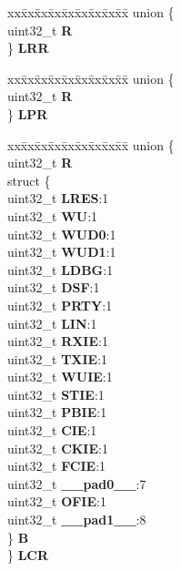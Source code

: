 \begin{DoxyCompactItemize}
\begin{tabbing}
\end{tabbing}\item 
\mbox{\label{structESCI__tag_acfca03def782b20da6a070330d2874b5}} 
\begin{tabbing}
xx\=xx\=xx\=xx\=xx\=xx\=xx\=xx\=xx\=\kill
union \{\\
\>uint32\_t {\bfseries R}\\
\} {\bfseries LRR}\\

\end{tabbing}\item 
\mbox{\label{structESCI__tag_adacd496165903d2f634d633ee7f3e37d}} 
\begin{tabbing}
xx\=xx\=xx\=xx\=xx\=xx\=xx\=xx\=xx\=\kill
union \{\\
\>uint32\_t {\bfseries R}\\
\} {\bfseries LPR}\\

\end{tabbing}\item 
\mbox{\label{structESCI__tag_ab3b84db9c2e74edcdc523254f2b716f8}} 
\begin{tabbing}
xx\=xx\=xx\=xx\=xx\=xx\=xx\=xx\=xx\=\kill
union \{\\
\>uint32\_t {\bfseries R}\\
\>struct \{\\
\>\>uint32\_t {\bfseries LRES}:1\\
\>\>uint32\_t {\bfseries WU}:1\\
\>\>uint32\_t {\bfseries WUD0}:1\\
\>\>uint32\_t {\bfseries WUD1}:1\\
\>\>uint32\_t {\bfseries LDBG}:1\\
\>\>uint32\_t {\bfseries DSF}:1\\
\>\>uint32\_t {\bfseries PRTY}:1\\
\>\>uint32\_t {\bfseries LIN}:1\\
\>\>uint32\_t {\bfseries RXIE}:1\\
\>\>uint32\_t {\bfseries TXIE}:1\\
\>\>uint32\_t {\bfseries WUIE}:1\\
\>\>uint32\_t {\bfseries STIE}:1\\
\>\>uint32\_t {\bfseries PBIE}:1\\
\>\>uint32\_t {\bfseries CIE}:1\\
\>\>uint32\_t {\bfseries CKIE}:1\\
\>\>uint32\_t {\bfseries FCIE}:1\\
\>\>uint32\_t {\bfseries \_\_pad0\_\_}:7\\
\>\>uint32\_t {\bfseries OFIE}:1\\
\>\>uint32\_t {\bfseries \_\_pad1\_\_}:8\\
\>\} {\bfseries B}\\
\} {\bfseries LCR}\\


\end{tabbing}
\end{DoxyCompactItemize}
